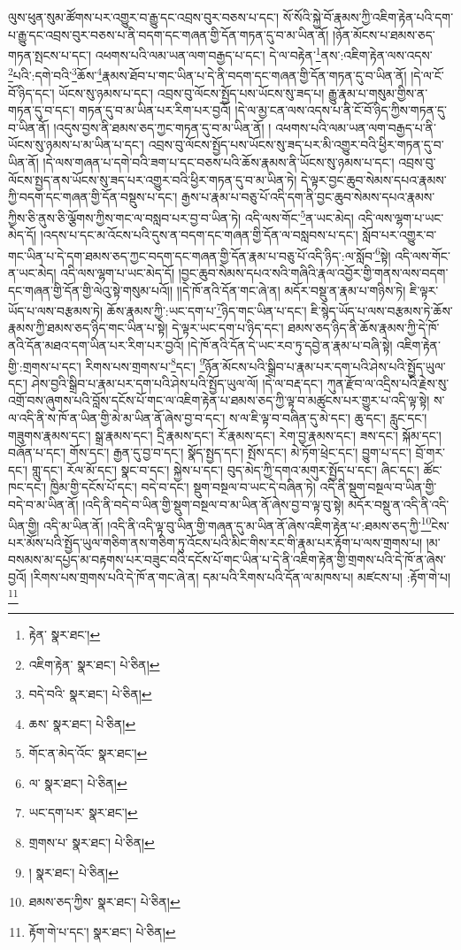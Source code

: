ལུས་ཕུན་སུམ་ཚོགས་པར་འགྱུར་བ་རྒྱུ་དང་འབྲས་བུར་བཅས་པ་དང་། སོ་སོའི་སྐྱེ་བོ་རྣམས་ཀྱི་འཇིག་རྟེན་པའི་དག་པ་རྒྱུ་དང་འབྲས་བུར་བཅས་པ་ནི་བདག་དང་གཞན་གྱི་དོན་གཏན་དུ་བ་མ་ཡིན་ནོ། །ཉོན་མོངས་པ་ཐམས་ཅད་གཏན་སྤངས་པ་དང་། འཕགས་པའི་ལམ་ཡན་ལག་བརྒྱད་པ་དང་། དེ་ལ་བརྟེན་\footnote{རྟེན་  སྣར་ཐང་། }ནས་:འཇིག་རྟེན་ལས་འདས་\footnote{འཇིག་རྟེན་  སྣར་ཐང་།  པེ་ཅིན། }པའི་:དགེ་བའི་\footnote{བདེ་བའི་  སྣར་ཐང་།  པེ་ཅིན། }ཆོས་\footnote{ཆས་  སྣར་ཐང་།  པེ་ཅིན། }རྣམས་ཐོབ་པ་གང་ཡིན་པ་དེ་ནི་བདག་དང་གཞན་གྱི་དོན་གཏན་དུ་བ་ཡིན་ནོ། །དེ་ལ་ངོ་བོ་ཉིད་དང་། ཡོངས་སུ་ཉམས་པ་དང་། འབྲས་བུ་ལོངས་སྤྱོད་པས་ཡོངས་སུ་ཟད་པ། རྒྱུ་རྣམ་པ་གསུམ་གྱིས་ན་གཏན་དུ་བ་དང་། གཏན་དུ་བ་མ་ཡིན་པར་རིག་པར་བྱའོ། །དེ་ལ་མྱ་ངན་ལས་འདས་པ་ནི་ངོ་བོ་ཉིད་ཀྱིས་གཏན་དུ་བ་ཡིན་ནོ། །འདུས་བྱས་ནི་ཐམས་ཅད་ཀྱང་གཏན་དུ་བ་མ་ཡིན་ནོ། །
འཕགས་པའི་ལམ་ཡན་ལག་བརྒྱད་པ་ནི་ཡོངས་སུ་ཉམས་པ་མ་ཡིན་པ་དང་། འབྲས་བུ་ལོངས་སྤྱོད་པས་ཡོངས་སུ་ཟད་པར་མི་འགྱུར་བའི་ཕྱིར་གཏན་དུ་བ་ཡིན་ནོ། །དེ་ལས་གཞན་པ་དགེ་བའི་ཟག་པ་དང་བཅས་པའི་ཆོས་རྣམས་ནི་ཡོངས་སུ་ཉམས་པ་དང་། འབྲས་བུ་ལོངས་སྤྱད་ནས་ཡོངས་སུ་ཟད་པར་འགྱུར་བའི་ཕྱིར་གཏན་དུ་བ་མ་ཡིན་ཏེ། དེ་ལྟར་བྱང་ཆུབ་སེམས་དཔའ་རྣམས་ཀྱི་བདག་དང་གཞན་གྱི་དོན་བསྡུས་པ་དང་། རྒྱས་པ་རྣམ་པ་བཅུ་པོ་འདི་དག་ནི་བྱང་ཆུབ་སེམས་དཔའ་རྣམས་ཀྱིས་ཅི་ནུས་ཅི་ལྕོགས་ཀྱིས་གང་ལ་བསླབ་པར་བྱ་བ་ཡིན་ཏེ། འདི་ལས་གོང་\footnote{གོང་ན་མེད་འོང་  སྣར་ཐང་། }ན་ཡང་མེད། འདི་ལས་ལྷག་པ་ཡང་མེད་དོ། །འདས་པ་དང་མ་འོངས་པའི་དུས་ན་བདག་དང་གཞན་གྱི་དོན་ལ་བསླབས་པ་དང་། སློབ་པར་འགྱུར་བ་གང་ཡིན་པ་དེ་དག་ཐམས་ཅད་ཀྱང་བདག་དང་གཞན་གྱི་དོན་རྣམ་པ་བཅུ་པོ་འདི་ཉིད་:ལ་སློབ་\footnote{ལ་  སྣར་ཐང་།  པེ་ཅིན། }སྟེ། འདི་ལས་གོང་ན་ཡང་མེད། འདི་ལས་ལྷག་པ་ཡང་མེད་དོ། །བྱང་ཆུབ་སེམས་དཔའ་སའི་གཞིའི་རྣལ་འབྱོར་གྱི་གནས་ལས་བདག་དང་གཞན་གྱི་དོན་གྱི་ལེའུ་སྟེ་གསུམ་པའོ།། །།དེ་ཁོ་ནའི་དོན་གང་ཞེ་ན། མདོར་བསྡུ་ན་རྣམ་པ་གཉིས་ཏེ། ཇི་ལྟར་ཡོད་པ་ལས་བརྩམས་ཏེ། ཆོས་རྣམས་ཀྱི་:ཡང་དག་པ་\footnote{ཡང་དག་པར་  སྣར་ཐང་། }ཉིད་གང་ཡིན་པ་དང་། ཇི་སྙེད་ཡོད་པ་ལས་བརྩམས་ཏེ་ཆོས་རྣམས་ཀྱི་ཐམས་ཅད་ཉིད་གང་ཡིན་པ་སྟེ། དེ་ལྟར་ཡང་དག་པ་ཉིད་དང་། ཐམས་ཅད་ཉིད་ནི་ཆོས་རྣམས་ཀྱི་དེ་ཁོ་ནའི་དོན་མཐའ་དག་ཡིན་པར་རིག་པར་བྱའོ། །དེ་ཁོ་ནའི་དོན་དེ་ཡང་རབ་ཏུ་དབྱེ་ན་རྣམ་པ་བཞི་སྟེ། འཇིག་རྟེན་གྱི་:གྲགས་པ་དང་། རིགས་པས་གྲགས་པ་\footnote{གྲགས་པ་  སྣར་ཐང་།  པེ་ཅིན། }དང་། \footnote{།    སྣར་ཐང་།  པེ་ཅིན། }ཉོན་མོངས་པའི་སྒྲིབ་པ་རྣམ་པར་དག་པའི་ཤེས་པའི་སྤྱོད་ཡུལ་དང་། ཤེས་བྱའི་སྒྲིབ་པ་རྣམ་པར་དག་པའི་ཤེས་པའི་སྤྱོད་ཡུལ་ལོ། །དེ་ལ་བརྡ་དང་། ཀུན་རྫོབ་ལ་འདྲིས་པའི་རྗེས་སུ་འགྲོ་བས་ཞུགས་པའི་བློས་དངོས་པོ་གང་ལ་འཇིག་རྟེན་པ་ཐམས་ཅད་ཀྱི་ལྟ་བ་མཚུངས་པར་གྱུར་པ་འདི་ལྟ་སྟེ། ས་ལ་འདི་ནི་ས་ཁོ་ན་ཡིན་གྱི་མེ་མ་ཡིན་ནོ་ཞེས་བྱ་བ་དང་། ས་ལ་ཇི་ལྟ་བ་བཞིན་དུ་མེ་དང་། ཆུ་དང་། རླུང་དང་། གཟུགས་རྣམས་དང་། སྒྲ་རྣམས་དང་། དྲི་རྣམས་དང་། རོ་རྣམས་དང་། རེག་བྱ་རྣམས་དང་། ཟས་དང་། སྐོམ་དང་། བཞོན་པ་དང་། གོས་དང་། རྒྱན་དུ་བྱ་བ་དང་། སྣོད་སྤྱད་དང་། སྤོས་དང་། མེ་ཏོག་ཕྲེང་དང་། བྱུག་པ་དང་། བྲོ་གར་དང་། གླུ་དང་། རོལ་མོ་དང་། སྣང་བ་དང་། སྐྱེས་པ་དང་། བུད་མེད་ཀྱི་དགའ་མགུར་སྤྱོད་པ་དང་། ཞིང་དང་། ཚོང་ཁང་དང་། ཁྱིམ་གྱི་དངོས་པོ་དང་། བདེ་བ་དང་། སྡུག་བསྔལ་བ་ཡང་དེ་བཞིན་ཏེ། འདི་ནི་སྡུག་བསྔལ་བ་ཡིན་གྱི་བདེ་བ་མ་ཡིན་ནོ། །འདི་ནི་བདེ་བ་ཡིན་གྱི་སྡུག་བསྔལ་བ་མ་ཡིན་ནོ་ཞེས་བྱ་བ་ལྟ་བུ་སྟེ། མདོར་བསྡུ་ན་འདི་ནི་འདི་ཡིན་གྱི། འདི་མ་ཡིན་ནོ། །འདི་ནི་འདི་ལྟ་བུ་ཡིན་གྱི་གཞན་དུ་མ་ཡིན་ནོ་ཞེས་འཇིག་རྟེན་པ་:ཐམས་ཅད་ཀྱི་\footnote{ཐམས་ཅད་ཀྱིས་  སྣར་ཐང་།  པེ་ཅིན། }ངེས་པར་མོས་པའི་སྤྱོད་ཡུལ་གཅིག་ནས་གཅིག་ཏུ་འོངས་པའི་མིང་གིས་རང་གི་རྣམ་པར་རྟོག་པ་ལས་གྲགས་པ། །མ་བསམས་མ་དཔྱད་མ་བརྟགས་པར་བཟུང་བའི་དངོས་པོ་གང་ཡིན་པ་དེ་ནི་འཇིག་རྟེན་གྱི་གྲགས་པའི་དེ་ཁོ་ན་ཞེས་བྱའོ། །རིགས་པས་གྲགས་པའི་དེ་ཁོ་ན་གང་ཞེ་ན། དམ་པའི་རིགས་པའི་དོན་ལ་མཁས་པ། མཛངས་པ། :རྟོག་གེ་པ།\footnote{རྟོག་གེ་པ་དང་།  སྣར་ཐང་།  པེ་ཅིན། } 